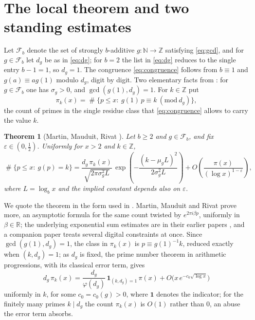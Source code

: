 \documentclass[11pt,reqno]{amsart}
\theoremstyle{plain}
\newtheorem{theorem}{Theorem}[section]
\theoremstyle{definition}
\newcommand{\N}{\mathbb{N}}
\newcommand{\Z}{\mathbb{Z}}
\newcommand{\R}{\mathbb{R}}
\DeclareMathOperator{\Card}{\#}
\begin{document}
\section{The local theorem and two standing estimates}\label{sec:local}

Let $\mathcal F_b$ denote the set of strongly $b$-additive $g\colon\N\to\Z$ satisfying \eqref{eq:gcd}, and for $g\in\mathcal F_b$ let $d_g$ be as in \eqref{eq:dg}; for $b=2$ the list in \eqref{eq:dg} reduces to the single entry $b-1=1$, so $d_g=1$. The congruence \eqref{eq:congruence} follows from $b\equiv1$ and $g(a)\equiv ag(1)$ modulo $d_g$, digit by digit. Two elementary facts from \cite[Lemma 2.2]{vibefrtz}: for $g\in\mathcal F_b$ one has $\sigma_g>0$, and $\gcd(g(1),d_g)=1$. For $k\in\Z$ put
\[
\pi_k(x)=\Card\{p\le x:\ g(1)\,p\equiv k\ (\mathrm{mod}\ d_g)\},
\]
the count of primes in the single residue class that \eqref{eq:congruence} allows to carry the value $k$.

\begin{theorem}[Martin, Mauduit, Rivat {\cite[Th\'eor\`eme 1]{mmr2019}}]\label{thm:mmr}
Let $b\ge2$ and $g\in\mathcal F_b$, and fix $\varepsilon\in(0,\tfrac12)$. Uniformly for $x>2$ and $k\in\Z$,
\begin{equation}\label{eq:mmr}
\Card\{p\le x:\ g(p)=k\}
=\frac{d_g\,\pi_k(x)}{\sqrt{2\pi\sigma_g^{2}L}}\,
\exp\left(-\frac{(k-\mu_gL)^{2}}{2\sigma_g^{2}L}\right)
+O\!\left(\frac{\pi(x)}{(\log x)^{1-\varepsilon}}\right),
\end{equation}
where $L=\log_bx$ and the implied constant depends also on $\varepsilon$.
\end{theorem}

We quote the theorem in the form used in \cite{vibefrtz}. Martin, Mauduit and Rivat prove more, an asymptotic formula for the same count twisted by $e^{2\pi i\beta p}$, uniformly in $\beta\in\R$; the underlying exponential sum estimates are in their earlier papers \cite{mmr2014,mmr2015}, and a companion paper \cite{mmr-multiple} treats several digital constraints at once. Since $\gcd(g(1),d_g)=1$, the class in $\pi_k(x)$ is $p\equiv g(1)^{-1}k$, reduced exactly when $(k,d_g)=1$; as $d_g$ is fixed, the prime number theorem in arithmetic progressions, with its classical error term, gives
\begin{equation}\label{eq:pik}
d_g\,\pi_k(x)=\frac{d_g}{\varphi(d_g)}\,\mathbf 1_{(k,d_g)=1}\,\pi(x)+O\big(x\,e^{-c_0\sqrt{\log x}}\big)
\end{equation}
uniformly in $k$, for some $c_0=c_0(g)>0$, where $\mathbf 1$ denotes the indicator; for the finitely many primes $k\mid d_g$ the count $\pi_k(x)$ is $O(1)$ rather than $0$, an abuse the error term absorbs.
\end{document}
